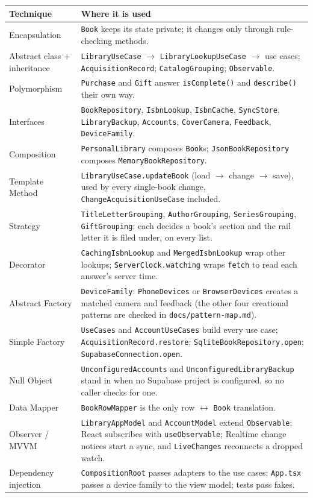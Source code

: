 \documentclass[12pt]{article}
\begin{document}
\begin{longtable}{|L{3.6cm}|L{11cm}|}
\hline
\textbf{Technique} & \textbf{Where it is used} \\
\hline
\endhead
Encapsulation & \texttt{Book} keeps its state private; it changes only through rule-checking methods. \\
Abstract class + inheritance & \texttt{LibraryUseCase} $\rightarrow$ \texttt{LibraryLookupUseCase} $\rightarrow$ use cases; \texttt{AcquisitionRecord}; \texttt{CatalogGrouping}; \texttt{Observable}. \\
Polymorphism & \texttt{Purchase} and \texttt{Gift} answer \texttt{isComplete()} and \texttt{describe()} their own way. \\
Interfaces & \texttt{BookRepository}, \texttt{IsbnLookup}, \texttt{IsbnCache}, \texttt{SyncStore}, \texttt{LibraryBackup}, \texttt{Accounts}, \texttt{CoverCamera}, \texttt{Feedback}, \texttt{DeviceFamily}. \\
Composition & \texttt{PersonalLibrary} composes \texttt{Book}s; \texttt{JsonBookRepository} composes \texttt{MemoryBookRepository}. \\
Template Method & \texttt{LibraryUseCase.updateBook} (load $\rightarrow$ change $\rightarrow$ save), used by every single-book change, \texttt{ChangeAcquisitionUseCase} included. \\
Strategy & \texttt{TitleLetterGrouping}, \texttt{AuthorGrouping}, \texttt{SeriesGrouping}, \texttt{GiftGrouping}: each decides a book's section and the rail letter it is filed under, on every list. \\
Decorator & \texttt{CachingIsbnLookup} and \texttt{MergedIsbnLookup} wrap other lookups; \texttt{ServerClock.watching} wraps \texttt{fetch} to read each answer's server time. \\
Abstract Factory & \texttt{DeviceFamily}: \texttt{PhoneDevices} or \texttt{BrowserDevices} creates a matched camera and feedback (the other four creational patterns are checked in \texttt{docs/pattern-map.md}). \\
Simple Factory & \texttt{UseCases} and \texttt{AccountUseCases} build every use case; \texttt{AcquisitionRecord.restore}; \texttt{SqliteBookRepository.open}; \texttt{SupabaseConnection.open}. \\
Null Object & \texttt{UnconfiguredAccounts} and \texttt{UnconfiguredLibraryBackup} stand in when no Supabase project is configured, so no caller checks for one. \\
Data Mapper & \texttt{BookRowMapper} is the only row $\leftrightarrow$ \texttt{Book} translation. \\
Observer / MVVM & \texttt{LibraryAppModel} and \texttt{AccountModel} extend \texttt{Observable}; React subscribes with \texttt{useObservable}; Realtime change notices start a sync, and \texttt{LiveChanges} reconnects a dropped watch. \\
Dependency injection & \texttt{CompositionRoot} passes adapters to the use cases; \texttt{App.tsx} passes a device family to the view model; tests pass fakes. \\
\hline
\end{longtable}
\end{document}
